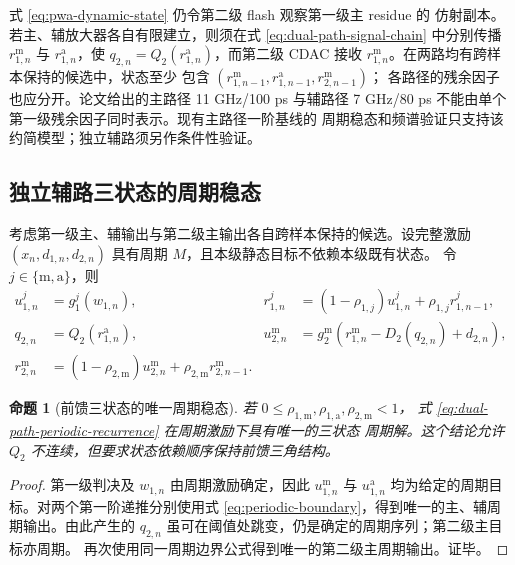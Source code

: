 \documentclass[11pt,a4paper]{ctexart}
\theoremstyle{adcplain}
\newtheorem{proposition}{命题}[section]
\theoremstyle{definition}
\begin{document}
式 \eqref{eq:pwa-dynamic-state} 仍令第二级 flash 观察第一级主 residue 的
仿射副本。若主、辅放大器各自有限建立，则须在式
\eqref{eq:dual-path-signal-chain} 中分别传播 $r_{1,n}^{\mathrm m}$ 与
$r_{1,n}^{\mathrm a}$，使 $q_{2,n}=Q_2(r_{1,n}^{\mathrm a})$，而第二级
CDAC 接收 $r_{1,n}^{\mathrm m}$。在两路均有跨样本保持的候选中，状态至少
包含 $(r_{1,n-1}^{\mathrm m},r_{1,n-1}^{\mathrm a},r_{2,n-1}^{\mathrm m})$；
各路径的残余因子也应分开。论文给出的主路径 11 GHz/100 ps 与辅路径
7 GHz/80 ps 不能由单个第一级残余因子同时表示。现有主路径一阶基线的
周期稳态和频谱验证只支持该约简模型；独立辅路须另作条件性验证。

\subsection{独立辅路三状态的周期稳态}

考虑第一级主、辅输出与第二级主输出各自跨样本保持的候选。设完整激励
$(x_n,d_{1,n},d_{2,n})$ 具有周期 $M$，且本级静态目标不依赖本级既有状态。
令 $j\in\{\mathrm m,\mathrm a\}$，则
\begin{align}
  u_{1,n}^{j}&=g_1^{j}(w_{1,n}), &
  r_{1,n}^{j}&=(1-\rho_{1,j})u_{1,n}^{j}
                +\rho_{1,j}r_{1,n-1}^{j},\\
  q_{2,n}&=Q_2(r_{1,n}^{\mathrm a}), &
  u_{2,n}^{\mathrm m}&=g_2^{\mathrm m}
    \!\left(r_{1,n}^{\mathrm m}-D_2(q_{2,n})+d_{2,n}\right),\\
  r_{2,n}^{\mathrm m}&=(1-\rho_{2,\mathrm m})u_{2,n}^{\mathrm m}
                    +\rho_{2,\mathrm m}r_{2,n-1}^{\mathrm m}.
  \label{eq:dual-path-periodic-recurrence}
\end{align}

\begin{proposition}[前馈三状态的唯一周期稳态]
若 $0\le\rho_{1,\mathrm m},\rho_{1,\mathrm a},\rho_{2,\mathrm m}<1$，
式 \eqref{eq:dual-path-periodic-recurrence} 在周期激励下具有唯一的三状态
周期解。这个结论允许 $Q_2$ 不连续，但要求状态依赖顺序保持前馈三角结构。
\end{proposition}

\begin{proof}
第一级判决及 $w_{1,n}$ 由周期激励确定，因此 $u_{1,n}^{\mathrm m}$ 与
$u_{1,n}^{\mathrm a}$ 均为给定的周期目标。对两个第一阶递推分别使用式
\eqref{eq:periodic-boundary}，得到唯一的主、辅周期输出。由此产生的
$q_{2,n}$ 虽可在阈值处跳变，仍是确定的周期序列；第二级主目标亦周期。
再次使用同一周期边界公式得到唯一的第二级主周期输出。证毕。
\end{proof}
\end{document}
